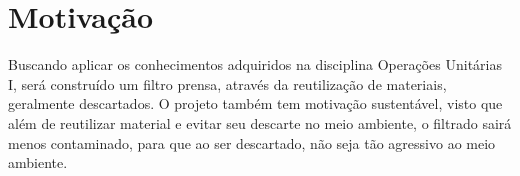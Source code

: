 \chapter{Motivação}\label{motivacao}

Buscando aplicar os conhecimentos adquiridos na disciplina Operações Unitárias
I, será construído um filtro prensa, através da reutilização de materiais,
geralmente descartados. O projeto também tem motivação sustentável, visto que
além de reutilizar material e evitar seu descarte no meio ambiente, o filtrado
sairá menos contaminado, para que ao ser descartado, não seja tão agressivo ao meio
ambiente.

